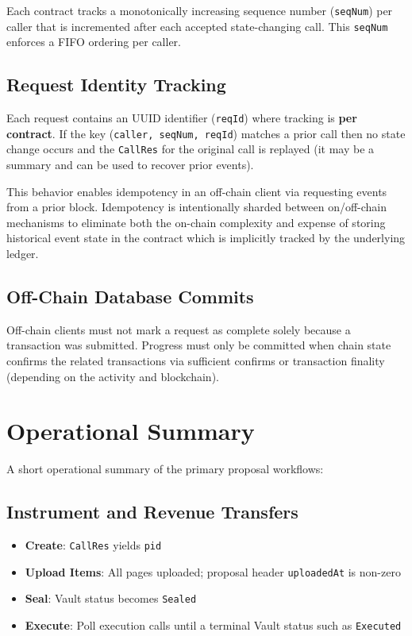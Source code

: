 \documentclass[10pt]{article}
\begin{document}
Each contract tracks a monotonically increasing sequence number (\texttt{seqNum}) per caller that is incremented
after each accepted state-changing call. This \texttt{seqNum} enforces a FIFO ordering per caller.

\subsection{Request Identity Tracking}

Each request contains an UUID identifier (\texttt{reqId}) where tracking is \textbf{per contract}. If the key (\texttt{caller, seqNum, reqId}) matches a prior call then no state change occurs and the \texttt{CallRes} for the original call is replayed (it may be a summary and can be used to recover prior events).

This behavior enables idempotency in an off-chain client via requesting events from a prior block. Idempotency is intentionally sharded between on/off-chain mechanisms to eliminate both the on-chain complexity and expense of storing historical event state in the contract which is implicitly tracked by the underlying ledger.

\subsection{Off-Chain Database Commits}
Off-chain clients must not mark a request as complete solely because a transaction was submitted. Progress must only be committed when chain state confirms the related transactions via sufficient confirms or transaction finality (depending on the activity and blockchain).

\section{Operational Summary}
A short operational summary of the primary proposal workflows:

\subsection{Instrument and Revenue Transfers}
\begin{itemize}
    \item \textbf{Create}: \texttt{CallRes} yields \texttt{pid}
    \item \textbf{Upload Items}: All pages uploaded; proposal header \texttt{uploadedAt} is non-zero
    \item \textbf{Seal}: Vault status becomes \texttt{Sealed}
    \item \textbf{Execute}: Poll execution calls until a terminal Vault status such as \texttt{Executed}
\end{itemize}
\end{document}
